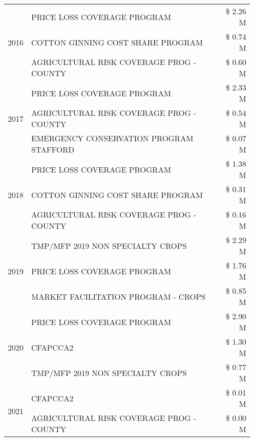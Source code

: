 \begin{tabular}{llr}
\multirow[t]{3}{*}{2016} & PRICE LOSS COVERAGE PROGRAM & \$ 2.26 M \\
 & COTTON GINNING COST SHARE PROGRAM & \$ 0.74 M \\
 & AGRICULTURAL RISK COVERAGE PROG - COUNTY & \$ 0.60 M \\
\cline{1-3}
\multirow[t]{3}{*}{2017} & PRICE LOSS COVERAGE PROGRAM & \$ 2.33 M \\
 & AGRICULTURAL RISK COVERAGE PROG - COUNTY & \$ 0.54 M \\
 & EMERGENCY CONSERVATION PROGRAM STAFFORD & \$ 0.07 M \\
\cline{1-3}
\multirow[t]{3}{*}{2018} & PRICE LOSS COVERAGE PROGRAM & \$ 1.38 M \\
 & COTTON GINNING COST SHARE PROGRAM & \$ 0.31 M \\
 & AGRICULTURAL RISK COVERAGE PROG - COUNTY & \$ 0.16 M \\
\cline{1-3}
\multirow[t]{3}{*}{2019} & TMP/MFP 2019 NON SPECIALTY CROPS & \$ 2.29 M \\
 & PRICE LOSS COVERAGE PROGRAM & \$ 1.76 M \\
 & MARKET FACILITATION PROGRAM - CROPS & \$ 0.85 M \\
\cline{1-3}
\multirow[t]{3}{*}{2020} & PRICE LOSS COVERAGE PROGRAM & \$ 2.90 M \\
 & CFAPCCA2 & \$ 1.30 M \\
 & TMP/MFP 2019 NON SPECIALTY CROPS & \$ 0.77 M \\
\cline{1-3}
\multirow[t]{2}{*}{2021} & CFAPCCA2 & \$ 0.01 M \\
 & AGRICULTURAL RISK COVERAGE PROG - COUNTY & \$ 0.00 M \\
\cline{1-3}
\bottomrule
\end{tabular}
